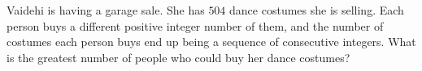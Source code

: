 Vaidehi is having a garage sale. She has $504$ dance costumes she is selling. Each person buys a different positive integer number of them, and the number of costumes each person buys end up being a sequence of consecutive integers. What is the greatest number of people who could buy her dance costumes?
